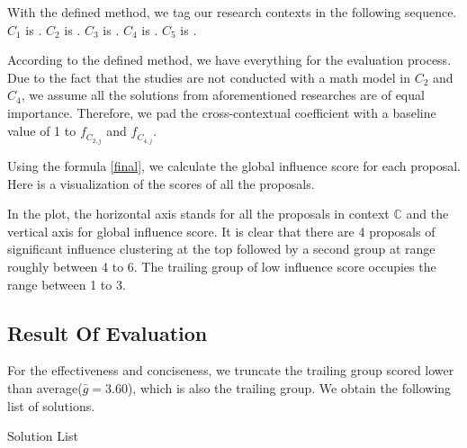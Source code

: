 With the defined method, we tag our research contexts in the following sequence.
$C_{1}$ is .
$C_{2}$ is .
$C_{3}$ is .
$C_{4}$ is .
$C_{5}$ is .

According to the defined method, we have everything for the evaluation process. Due to the fact that the studies are not conducted with a math model in $C_{2}$ and $C_{4}$, we assume all the solutions from aforementioned researches are of equal importance. Therefore, we pad the cross-contextual coefficient with a baseline value of 1 to $\mathit{f_{C_{2,j}}}$ and $\mathit{f_{C_{4,j}}}$.

Using the formula \ref{final}, we calculate the global influence score for each proposal. Here is a visualization of the scores of all the proposals.

\begin{figure}[ht]
\centering
{}
\end{figure}

In the plot, the horizontal axis stands for all the proposals in context $\mathbb{C}$ and the vertical axis for global influence score. It is clear that there are 4 proposals of significant influence clustering at the top followed by a second group at range roughly between 4 to 6. The trailing group of low influence score occupies the range between 1 to 3.

\subsection{Result Of Evaluation}
For the effectiveness and conciseness, we truncate the trailing group scored lower than average($\bar{g}=3.60$), which is also the trailing group. We obtain the following list of solutions.

\begin{table}[ht]
\caption{Solution List}
\label{tab:solution}
\end{table}


